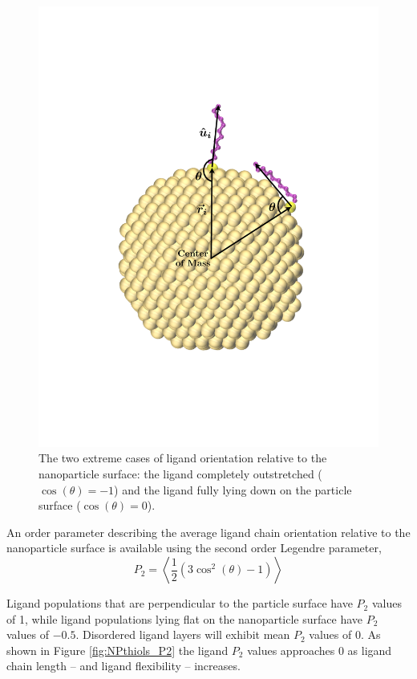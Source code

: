 \begin{figure}
  \includegraphics[width=\linewidth]{figures/NP_pAngle}
  \caption{The two extreme cases of ligand orientation relative to the
    nanoparticle surface: the ligand completely outstretched
    ($\cos{(\theta)} = -1$) and the ligand fully lying down on the
    particle surface ($\cos{(\theta)} = 0$).}
  \label{fig:NP_pAngle}
\end{figure}

An order parameter describing the average ligand chain orientation relative to
the nanoparticle surface is available using the second order Legendre
parameter,
\begin{equation}
	P_2 = \left< \frac{1}{2} \left(3\cos^2(\theta) - 1 \right) \right>
\end{equation}

Ligand populations that are perpendicular to the particle surface have
$P_2$ values of 1, while ligand populations lying flat on the
nanoparticle surface have $P_2$ values of $-0.5$. Disordered ligand
layers will exhibit mean $P_2$ values of 0. As shown in Figure
\ref{fig:NPthiols_P2} the ligand $P_2$ values approaches 0 as
ligand chain length -- and ligand flexibility -- increases.

